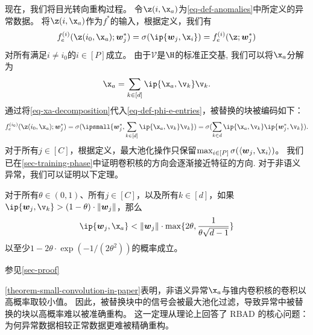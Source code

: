 现在，我们将目光转向重构过程。
令$\z(i,\x_a)$为\cref{eq-def-anomalies}中所定义的异常数据。
将$\z(i,\x_a)$作为$f^*$的输入，根据定义，我们有
\begin{equation}
    f_e^{(i)}(\z(i_0,\x_a); \boldsymbol{w}^{*}_j) = \sigma(\ip{\boldsymbol{w}_j, \x_i}) = f^{(i)}_e(\z; \boldsymbol{w}^{*}_j)
\end{equation}
对所有满足$i \neq i_0$的$ i \in [P]$成立。
由于$\mathcal{V}$是$\H$的标准正交基, 我们可以将$\x_a$分解为 
\begin{equation}\label{eq-xa-decomposition}
    \x_a = \sum_{k \in [d]} \ip{\x_a,\v_k} \v_k.
\end{equation}
通过将\cref{eq-xa-decomposition}代入\cref{eq-def-phi-e-entries}，被替换的块被编码如下：
\begin{equation}
    f_e^{(i_0)}(\z(i_0,\x_a); \boldsymbol{w}^{*}_j) 
    =  \sigma(\ipsmall{\boldsymbol{w}_j^*, \sum_{k \in [d]} \ip{\x_a,\v_k} \v_k}) 
    = \sigma( \sum_{k \in d} \ip{\x_a,\v_k} \ip{\boldsymbol{w}_j^*,\v_k} ).
\end{equation}
对于所有$ j \in [C]$，根据定义，最大池化操作只保留$\max_{i \in [P]} \sigma(\langle \boldsymbol{w}_j,\x_i \rangle)$。
我们已在\cref{sec-training-phase}中证明卷积核的方向会逐渐接近特征的方向.
对于非语义异常，我们可以证明以下定理。
\begin{theorem}\label{theorem-small-convolution-in-paper}
    对于所有$ \theta \in (0,1)$、所有$j \in [C]$，以及所有$k \in [d]$，如果$\ip{\boldsymbol{w}_j, \v_k} > (1 - \theta)\cdot \|\boldsymbol{w}_j\|$，那么
    \begin{equation}
        \ip{{\boldsymbol{w}_j}, \x_a} < \|\boldsymbol{w}_j\| \cdot \max\{ 2\theta, \frac{1}{\theta \sqrt{d-1}} \}
    \end{equation}
    以至少$1 - 2\theta \cdot \exp(-1/(2\theta^2))$的概率成立。
\end{theorem}

\begin{myproof}
    参见\cref{sec-proof}
\end{myproof}

\cref{theorem-small-convolution-in-paper}表明，非语义异常$\x_a$与锥内卷积核的卷积以高概率取较小值。
因此，被替换块中的信号会被最大池化过滤，导致异常中被替换的块以高概率难以被准确重构。
这一定理从理论上回答了 RBAD 的核心问题：为何异常数据相较正常数据更难被精确重构。

